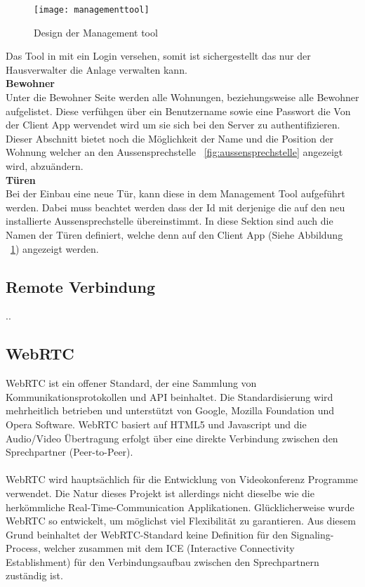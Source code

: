 \begin{figure}[htb!]
	\begin{center}
		\texttt{[image: managementtool]}
		\caption[Design der Management tool]{Design der Management tool}
		\label{fig:managementtool}
	\end{center}
\end{figure}

Das Tool in mit ein Login versehen, somit ist sichergestellt das nur der Hausverwalter die Anlage verwalten kann. 
\\
\textbf{Bewohner} 
\\
Unter die Bewohner Seite werden alle Wohnungen, beziehungsweise alle Bewohner aufgelistet. Diese verfühgen über ein Benutzername sowie eine Passwort die Von der Client App wervendet wird um sie sich bei den Server zu authentifizieren. Dieser Abschnitt bietet noch die Möglichkeit der Name und die Position der Wohnung welcher an den Aussensprechstelle ~\ref{fig:aussensprechstelle} angezeigt wird, abzuändern.
\\
\textbf{Türen} 
\\
Bei der Einbau eine neue Tür, kann diese in dem Management Tool aufgeführt werden. Dabei muss beachtet werden dass der Id mit derjenige die auf den neu installierte Aussensprechstelle übereinstimmt. In diese Sektion sind auch die Namen der Türen definiert, welche denn auf den Client App (Siehe Abbildung ~\ref{fig:managementtool})  angezeigt werden. 


\subsection{Remote Verbindung}
\label{kap:remote}
..

\subsection{WebRTC}
\label{kap:webrtc}
WebRTC ist ein offener Standard, der eine Sammlung von Kommunikationsprotokollen und API beinhaltet. Die Standardisierung wird mehrheitlich betrieben und unterstützt von Google, Mozilla Foundation und Opera Software. WebRTC basiert auf HTML5 und Javascript und die Audio/Video Übertragung erfolgt über eine direkte Verbindung zwischen den Sprechpartner (Peer-to-Peer).
\\
\\
WebRTC wird hauptsächlich für die Entwicklung von Videokonferenz Programme verwendet. Die Natur dieses Projekt ist allerdings nicht dieselbe wie die herkömmliche Real-Time-Communication Applikationen. Glücklicherweise wurde WebRTC so entwickelt, um möglichst viel Flexibilität zu garantieren. Aus diesem Grund beinhaltet der WebRTC-Standard keine Definition für den Signaling-Process, welcher zusammen mit dem ICE (Interactive Connectivity Establishment) für den Verbindungsaufbau zwischen den Sprechpartnern zuständig ist. 

